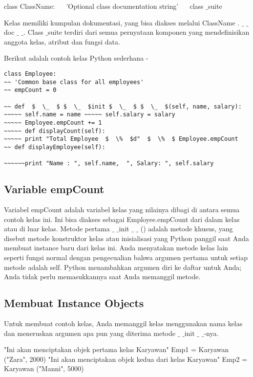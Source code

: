 class ClassName:
~~ 'Optional class documentation string'
~~ class $  \_  $suite


Kelas memiliki kumpulan dokumentasi, yang bisa diakses melalui ClassName . $  \_  $ $  \_  $ doc $  \_  $ $  \_  $.  Class $  \_  $suite terdiri dari semua pernyataan komponen yang mendefinisikan anggota kelas, atribut dan fungsi data.

Berikut adalah contoh kelas Python sederhana -
\begin{verbatim}
class Employee:
~~ 'Common base class for all employees'
~~ empCount = 0

~~ def  $  \_  $ $  \_  $init $  \_  $ $  \_  $(self, name, salary):
~~~~~ self.name = name ~~~~~ self.salary = salary
~~~~~ Employee.empCount += 1
~~~~~ def displayCount(self):
~~~~~ print "Total Employee  $  \%  $d"  $  \%  $ Employee.empCount
~~ def displayEmployee(self):

~~~~~~print "Name : ", self.name,  ", Salary: ", self.salary
\end{verbatim}

\subsection{Variable empCount}

Variabel empCount adalah variabel kelas yang nilainya dibagi di antara semua contoh kelas ini. Ini bisa diakses sebagai Employee.empCount dari dalam kelas atau di luar kelas. Metode pertama  $  \_  $ $  \_  $init  $  \_  $ $  \_ $ () adalah metode khusus, yang disebut metode konstruktor kelas atau inisialisasi yang Python panggil saat Anda membuat instance baru dari kelas ini. Anda menyatakan metode kelas lain seperti fungsi normal dengan pengecualian bahwa argumen pertama untuk setiap metode adalah self. Python menambahkan argumen diri ke daftar untuk Anda; Anda tidak perlu memasukkannya saat Anda memanggil metode.

\subsection{Membuat Instance Objects}
Untuk membuat contoh kelas, Anda memanggil kelas menggunakan nama kelas dan meneruskan argumen apa pun yang diterima metode  $  \_  $ $  \_  $init $  \_  $ $  \_  $-nya.

"Ini akan menciptakan objek pertama kelas Karyawan"
Emp1 = Karyawan ("Zara", 2000)
"Ini akan menciptakan objek kedua dari kelas Karyawan"
Emp2 = Karyawan ("Manni", 5000)


